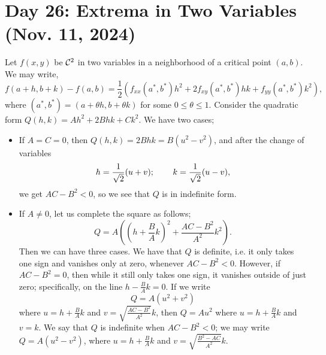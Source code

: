 \section{Day 26: Extrema in Two Variables (Nov. 11, 2024)}
Let $f(x, y)$ be $\mathcal C^2$ in two variables in a neighborhood of a critical point $(a, b)$. We may write,
\[ f(a + h, b + k) - f(a, b) = \frac{1}{2}(f_{xx}(a^\ast, b^\ast) h^2 + 2f_{xy}(a^\ast, b^\ast) hk + f_{yy}(a^\ast, b^\ast) k^2), \]
where $(a^\ast, b^\ast) = (a + \theta h, b + \theta k)$ for some $0 \leq \theta \leq 1$. Consider the quadratic form $Q(h, k) = Ah^2 + 2Bhk + Ck^2$. We have two cases;
\begin{itemize}
    \item If $A = C = 0$, then $Q(h, k) = 2Bhk = B(u^2 - v^2)$, and after the change of variables
    \[ h = \frac{1}{\sqrt{2}}(u + v); \hspace{0.3in} k = \frac{1}{\sqrt{2}}(u - v), \]
    we get $AC - B^2 < 0$, so we see that $Q$ is in indefinite form.
    \item If $A \neq 0$, let us complete the square as follows;
    \[ Q = A \left( (h + \frac{B}{A}k)^2 + \frac{AC - B^2}{A^2}k^2 \right). \]
    Then we can have three cases. We have that $Q$ is definite, i.e. it only takes one sign and vanishes only at zero, whenever $AC - B^2 < 0$. However, if $AC - B^2 = 0$, then while it still only takes one sign, it vanishes outside of just zero; specifically, on the line $h - \frac{B}{A}k = 0$. If we write
    \[ Q = A(u^2 + v^2) \]
    where $u = h + \frac{B}{A}k$ and $v = \sqrt{\frac{AC - B^2}{A^2}}k$, then $Q = Au^2$ where $u = h + \frac{B}{A}k$ and $v = k$.
    \medskip\newline
    We say that $Q$ is indefinite when $AC - B^2 < 0$; we may write $Q = A(u^2 - v^2)$, where $u = h + \frac{B}{A}k$ and $v = \sqrt{\frac{B^2 - AC}{A^2}}k$.
\end{itemize}

